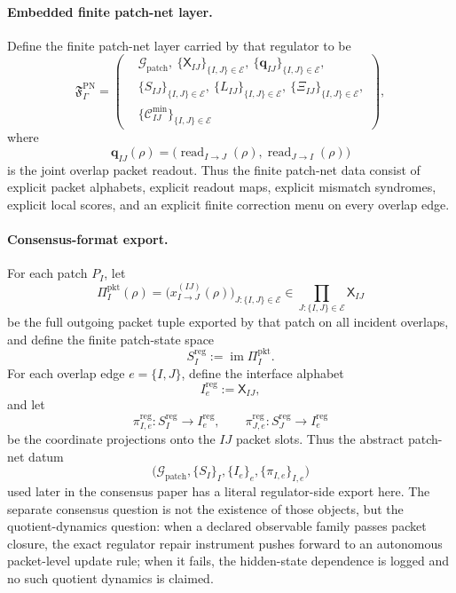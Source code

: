 \documentclass[11pt]{article}
\begin{document}
\paragraph{Embedded finite patch-net layer.}
Define the finite patch-net layer carried by that regulator to be
\begin{equation}
\mathfrak F_{\Gamma}^{\mathrm{PN}}
=
\left(
\begin{aligned}
&\mathcal G_{\mathrm{patch}},
\ \{\mathsf X_{IJ}\}_{\{I,J\}\in\mathcal E},
\ \{\mathbf q_{IJ}\}_{\{I,J\}\in\mathcal E},\\
&\{S_{IJ}\}_{\{I,J\}\in\mathcal E},
\ \{L_{IJ}\}_{\{I,J\}\in\mathcal E},
\ \{\Xi_{IJ}\}_{\{I,J\}\in\mathcal E},\\
&\{\mathcal C_{IJ}^{\mathrm{min}}\}_{\{I,J\}\in\mathcal E}
\end{aligned}
\right),
\end{equation}
where
\begin{equation}
\mathbf q_{IJ}(\rho)
=
\bigl(
\operatorname{read}_{I\to J}(\rho),
\operatorname{read}_{J\to I}(\rho)
\bigr)
\end{equation}
is the joint overlap packet readout. Thus the finite patch-net data consist of explicit packet
alphabets, explicit readout maps, explicit mismatch syndromes, explicit local scores, and an
explicit finite correction menu on every overlap edge.

\paragraph{Consensus-format export.}
For each patch $P_I$, let
\begin{equation}
\Pi_I^{\mathrm{pkt}}(\rho)
=
\bigl(
x_{I\to J}^{(IJ)}(\rho)
\bigr)_{J:\{I,J\}\in\mathcal E}
\in
\prod_{J:\{I,J\}\in\mathcal E}\mathsf X_{IJ}
\end{equation}
be the full outgoing packet tuple exported by that patch on all incident overlaps, and define the
finite patch-state space
\begin{equation}
S_I^{\mathrm{reg}}
:=
\operatorname{im}\Pi_I^{\mathrm{pkt}}.
\end{equation}
For each overlap edge $e=\{I,J\}$, define the interface alphabet
\begin{equation}
I_e^{\mathrm{reg}}:=\mathsf X_{IJ},
\end{equation}
and let
\begin{equation}
\pi_{I,e}^{\mathrm{reg}}:S_I^{\mathrm{reg}}\to I_e^{\mathrm{reg}},
\qquad
\pi_{J,e}^{\mathrm{reg}}:S_J^{\mathrm{reg}}\to I_e^{\mathrm{reg}}
\end{equation}
be the coordinate projections onto the $IJ$ packet slots. Thus the abstract patch-net datum
\[
\bigl(
\mathcal G_{\mathrm{patch}},
\{S_I\}_I,
\{I_e\}_e,
\{\pi_{I,e}\}_{I,e}
\bigr)
\]
used later in the consensus paper has a literal regulator-side export here. The separate consensus
question is not the existence of those objects, but the quotient-dynamics
question: when a declared observable family passes packet closure, the exact regulator repair
instrument pushes forward to an autonomous packet-level update rule; when it fails, the hidden-state
dependence is logged and no such quotient dynamics is claimed.
\end{document}
